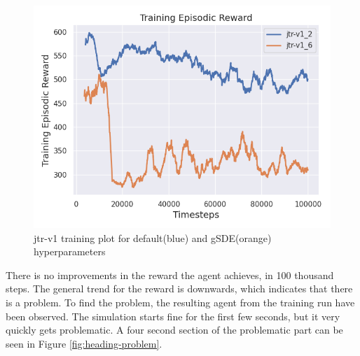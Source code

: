 \documentclass[12pt,twoside]{report}
\begin{document}
\begin{figure}[htbp]
\centering
\includegraphics[width = 0.65\hsize]{figures/rl-reward-plots/jtr-v1 100k.png}
\caption{jtr-v1 training plot for default(blue) and gSDE(orange) hyperparameters}
\label{fig:jtr-v1}
\end{figure}

There is no improvements in the reward the agent achieves, in 100 thousand steps. The general trend for the reward is downwards, which indicates that there is a problem. To find the problem, the resulting agent from the training run have been observed. The simulation starts fine for the first few seconds, but it very quickly gets problematic. A four second section of the problematic part can be seen in Figure \ref{fig:heading-problem}. 
\end{document}
